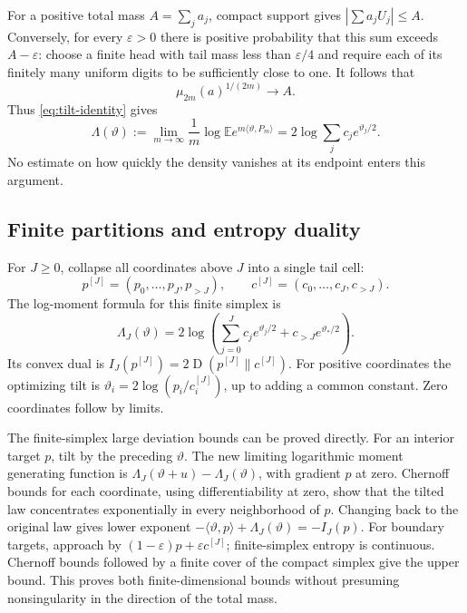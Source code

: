 \documentclass[11pt,a4paper]{article}
\numberwithin{equation}{section}
\theoremstyle{definition}
\theoremstyle{remark}
\newcommand{\E}{\mathbb E}
\newcommand{\KL}{\operatorname{D}}
\begin{document}
For a positive total mass $A=\sum_ja_j$, compact support gives
$|\sum a_jU_j|\le A$. Conversely, for every $\varepsilon>0$ there is
positive probability that this sum exceeds $A-\varepsilon$: choose a
finite head with tail mass less than $\varepsilon/4$ and require each of
its finitely many uniform digits to be sufficiently close to one.
It follows that
\begin{equation}
\mu_{2m}(a)^{1/(2m)}\longrightarrow A.
\label{eq:endpoint-moment}
\end{equation}
Thus \cref{eq:tilt-identity} gives
\begin{equation}
\Lambda(\vartheta):=
\lim_{m\to\infty}\frac1m\log\E e^{m\langle\vartheta,P_m\rangle}
=2\log\sum_jc_je^{\vartheta_j/2}.
\label{eq:limiting-mgf}
\end{equation}
No estimate on how quickly the density vanishes at its endpoint enters
this argument.

\subsection{Finite partitions and entropy duality}
For $J\ge0$, collapse all coordinates above $J$ into a single tail cell:
\[
p^{[J]}=(p_0,\ldots,p_J,p_{>J}),\qquad
c^{[J]}=(c_0,\ldots,c_J,c_{>J}).
\]
The log-moment formula for this finite simplex is
\[
\Lambda_J(\vartheta)=2\log\left(
 \sum_{j=0}^Jc_je^{\vartheta_j/2}
 +c_{>J}e^{\vartheta_*/2}\right).
\]
Its convex dual is $I_J(p^{[J]})=2\KL(p^{[J]}\|c^{[J]})$.
For positive coordinates the optimizing tilt is
$\vartheta_i=2\log(p_i/c_i^{[J]})$, up to adding a common constant.
Zero coordinates follow by limits.

The finite-simplex large deviation bounds can be proved directly. For an
interior target $p$, tilt by the preceding $\vartheta$. The new limiting
logarithmic moment generating function is
$\Lambda_J(\vartheta+u)-\Lambda_J(\vartheta)$, with gradient $p$ at
zero. Chernoff bounds for each coordinate, using differentiability at
zero, show that the tilted law concentrates exponentially in every
neighborhood of $p$. Changing back to the original law gives lower
exponent $-\langle\vartheta,p\rangle+\Lambda_J(\vartheta)=-I_J(p)$.
For boundary targets, approach by
$(1-\varepsilon)p+\varepsilon c^{[J]}$; finite-simplex entropy is
continuous. Chernoff bounds followed by a finite cover of the compact
simplex give the upper bound. This proves both finite-dimensional bounds
without presuming nonsingularity in the direction of the total mass.
\end{document}

